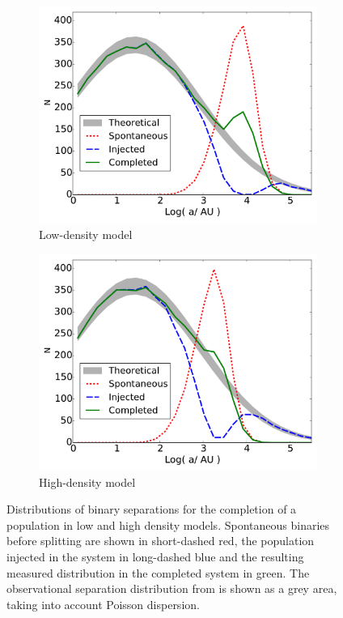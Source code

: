 \begin{figure}
    \centering
    \begin{subfigure}[b]{0.49\textwidth}
    	\centering
    	\includegraphics[width=\textwidth]{Figures/5_completed_smaxis_LD}
        \caption{Low-density model}
        \label{Fig:5_completed_smaxis_LD}
    \end{subfigure}
    \begin{subfigure}[b]{0.49\textwidth}
    	\centering
    	\includegraphics[width=\textwidth]{Figures/5_completed_smaxis_HD}
        \caption{High-density model}
        \label{Fig:5_completed_smaxis_HD}
    \end{subfigure}
\caption[Completed binary population: semi-major axis distribution]{Distributions of binary separations for the completion of a population in low and high density models. Spontaneous binaries before splitting are shown in short-dashed red, the population injected in the system in long-dashed blue and the resulting measured distribution in the completed system in green. The observational separation distribution from \protect\cite{Raghavan2010} is shown as a grey area, taking into account Poisson dispersion.}
\label{Fig:5_completed_smaxis}
\end{figure}

